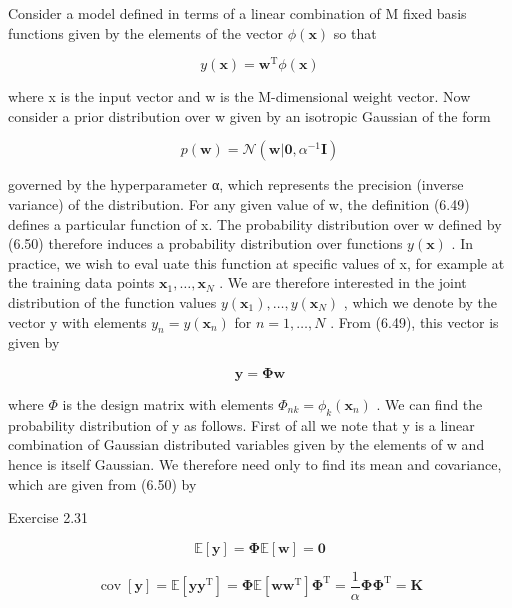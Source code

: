 \documentclass[
  10
]{article}
\begin{document}
Consider a model defined in terms of a linear combination of M fixed
basis functions given by the elements of the vector
\(\phi ( \mathbf { x } )\) so that

\[
y (\mathbf {x}) = \mathbf {w} ^ {\mathrm{T}} \phi (\mathbf {x})\tag{6.49}
\]

where x is the input vector and w is the M-dimensional weight vector.
Now consider a prior distribution over w given by an isotropic Gaussian
of the form

\[
p (\mathbf {w}) = \mathcal {N} (\mathbf {w} | \mathbf {0}, \alpha^ {- 1} \mathbf {I})\tag{6.50}
\]

governed by the hyperparameter α, which represents the precision
(inverse variance) of the distribution. For any given value of w, the
definition (6.49) defines a particular function of x. The probability
distribution over w defined by (6.50) therefore induces a probability
distribution over functions \(y ( \mathbf x )\) . In practice, we wish
to eval uate this function at specific values of x, for example at the
training data points
\(\mathbf { x } _ { 1 } , \ldots , \mathbf { x } _ { N }\) . We are
therefore interested in the joint distribution of the function values
\(y ( \mathbf { x } _ { 1 } ) , \ldots , y ( \mathbf { x } _ { N } )\) ,
which we denote by the vector y with elements
\(y _ { n } = y ( \mathbf { x } _ { n } )\) for \(n = 1 , \ldots , N\) .
From (6.49), this vector is given by

\[
\mathbf {y} = \boldsymbol {\Phi} \mathbf {w}\tag{6.51}
\]

where \(\Phi\) is the design matrix with elements
\(\Phi _ { n k } = \phi _ { k } ( \mathbf { x } _ { n } )\) . We can
find the probability distribution of y as follows. First of all we note
that y is a linear combination of Gaussian distributed variables given
by the elements of w and hence is itself Gaussian. We therefore need
only to find its mean and covariance, which are given from (6.50) by

Exercise 2.31

\[
{\mathbb {E} [ \mathbf {y} ]} = {\boldsymbol {\Phi} \mathbb {E} [ \mathbf {w} ] = \mathbf {0}}\tag{6.52}
\]

\[
\operatorname{cov} [ \mathbf {y} ] = \mathbb {E} \left[ \mathbf {y y} ^ {\mathrm{T}} \right] = \boldsymbol {\Phi} \mathbb {E} \left[ \mathbf {w w} ^ {\mathrm{T}} \right] \boldsymbol {\Phi} ^ {\mathrm{T}} = \frac {1}{\alpha} \boldsymbol {\Phi} \boldsymbol {\Phi} ^ {\mathrm{T}} = \mathbf {K}\tag{6.53}
\]
\end{document}
